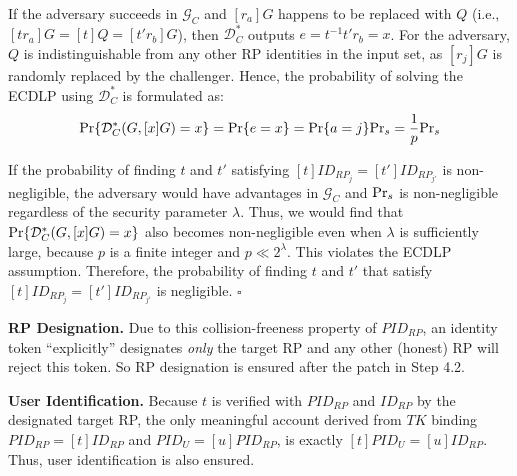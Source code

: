 If the adversary succeeds in $\mathcal{G}_C$ and $[r_a]G$ happens to be replaced with $Q$ (i.e., $[tr_a]G = [t]Q = [t'r_b]G$), then $\mathcal{D}^*_C$ outputs $e=t^{-1}t'r_b =x$. For the adversary, $Q$ is indistinguishable from any other RP identities in the input set, as $[r_j]G$ is randomly replaced by the challenger.
Hence, the probability of solving the ECDLP using $\mathcal{D}^*_C$ is formulated as:
\begin{equation*}
{\rm Pr}\{\mathcal{D}^*_C(G, [x]G)=x\} = {\rm Pr}\{e = x\}={\rm Pr}\{a=j\}{\rm Pr}_s=\frac{1}{p}{\rm Pr}_s
\end{equation*}

If the probability of finding $t$ and $t'$ satisfying $[t]ID_{RP_j} = [t']ID_{RP_{j'}}$ is non-negligible, the adversary would have advantages  in $\mathcal{G}_C$ and ${\rm Pr}_s$ is non-negligible regardless of the security parameter $\lambda$.
Thus, we would find that ${\rm Pr}\{\mathcal{D}^*_C(G, [x]G)=x\}$ also becomes non-negligible even when $\lambda$ is sufficiently large, because $p$ is a finite integer and $p \ll 2^\lambda$.
This violates the ECDLP assumption. Therefore, the probability of finding $t$ and $t'$ that satisfy $[t]ID_{RP_j} = [t']ID_{RP_{j'}}$ is negligible.
\hfill $\square$
\vspace{1mm}

\noindent \textbf{RP Designation.} 
Due to this collision-freeness property of $PID_{RP}$,
    an identity token ``explicitly'' designates \emph{only} the target RP and any other (honest) RP will reject this token.
So RP designation is ensured after the patch in Step 4.2.

\noindent \textbf{User Identification.} 
Because $t$ is verified with $PID_{RP}$ and $ID_{RP}$ by the designated target RP,
 the only meaningful account derived
from $TK$ binding $PID_{RP}=[t]ID_{RP}$ and $PID_U = [u]PID_{RP}$,
 is exactly $[t]PID_U =[u]ID_{RP}$. Thus, user identification is also ensured.

